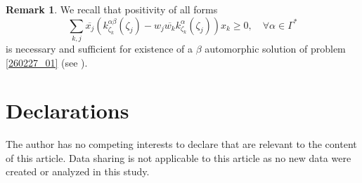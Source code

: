 \documentclass[reqno,11pt,centertags]{article}
\newcommand{\z}{\zeta}
\theoremstyle{definition}
\newtheorem{remark}[theorem]{Remark}
\def\a{\alpha}
\def\b{\beta}
\def\G{\Gamma}
\def\z{\zeta}
\begin{document}
\begin{remark}
We recall that positivity of all forms
$$
\sum\limits_{k,j}
\overline{x_j}
\left(
k^{\alpha\beta}_{\z_k}(\zeta_j)-w_j\overline{w_k} k^\alpha_{\z_k}(\zeta_j)
\right)
x_k \ge 0,
\quad \forall\a\in\G^*
$$
is necessary and sufficient for existence of a
$\b$ automorphic solution of problem \eqref{260227_01} (see \cite{Kup-Yud-1997}).
\end{remark}


\section{Declarations}
The author has no competing interests to declare that are relevant to the content of this article.
Data sharing is not applicable to this article as no new data were created or analyzed in this study.
\end{document}
